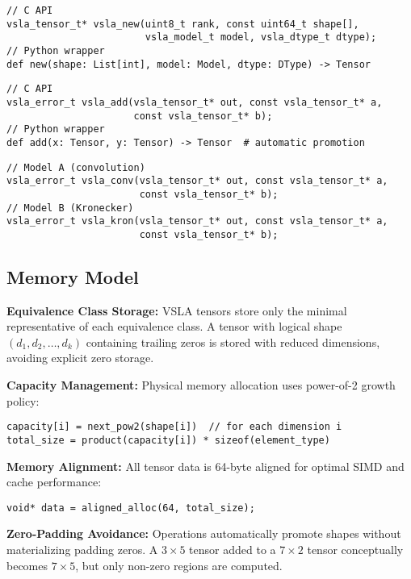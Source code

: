 \documentclass[11pt]{article}
\begin{document}
\begin{tcolorbox}[colback=api,colframe=green!50!black,title=C Library API Mapping]
\begin{description}[leftmargin=2em]
\item[Tensor Creation:] 
\begin{verbatim}
// C API
vsla_tensor_t* vsla_new(uint8_t rank, const uint64_t shape[], 
                        vsla_model_t model, vsla_dtype_t dtype);
// Python wrapper  
def new(shape: List[int], model: Model, dtype: DType) -> Tensor
\end{verbatim}

\item[Variable-Shape Operations:]
\begin{verbatim}
// C API  
vsla_error_t vsla_add(vsla_tensor_t* out, const vsla_tensor_t* a, 
                      const vsla_tensor_t* b);
// Python wrapper
def add(x: Tensor, y: Tensor) -> Tensor  # automatic promotion
\end{verbatim}

\item[Semiring Products:]
\begin{verbatim}
// Model A (convolution)
vsla_error_t vsla_conv(vsla_tensor_t* out, const vsla_tensor_t* a, 
                       const vsla_tensor_t* b);
// Model B (Kronecker)  
vsla_error_t vsla_kron(vsla_tensor_t* out, const vsla_tensor_t* a,
                       const vsla_tensor_t* b);
\end{verbatim}
\end{description}
\end{tcolorbox}

\subsection{Memory Model}
\label{sec:memory}

\begin{tcolorbox}[colback=memory,colframe=red!50!black,title=Memory Layout and Optimization]
\textbf{Equivalence Class Storage:} VSLA tensors store only the minimal representative of each equivalence class. A tensor with logical shape $(d_1, d_2, \ldots, d_k)$ containing trailing zeros is stored with reduced dimensions, avoiding explicit zero storage.

\textbf{Capacity Management:} Physical memory allocation uses power-of-2 growth policy:
\begin{verbatim}
capacity[i] = next_pow2(shape[i])  // for each dimension i
total_size = product(capacity[i]) * sizeof(element_type)  
\end{verbatim}

\textbf{Memory Alignment:} All tensor data is 64-byte aligned for optimal SIMD and cache performance:
\begin{verbatim}
void* data = aligned_alloc(64, total_size);
\end{verbatim}

\textbf{Zero-Padding Avoidance:} Operations automatically promote shapes without materializing padding zeros. A $3 \times 5$ tensor added to a $7 \times 2$ tensor conceptually becomes $7 \times 5$, but only non-zero regions are computed.
\end{tcolorbox}
\end{document}
